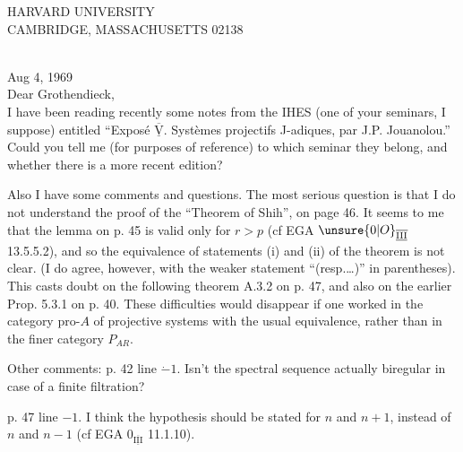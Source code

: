 \begin{center}
{\sffamily HARVARD UNIVERSITY\\
CAMBRIDGE, MASSACHUSETTS 02138}
\end{center}
\\
\hfill Aug 4, 1969\\

\noindent Dear Grothendieck,\\

I have been reading recently some notes from the IHES (one of your seminars, I suppose) entitled ``Exposé \(\overline{\underline{\mathrm{V}}}\). Systèmes
\reversemarginpar{}\normalmarginpar%
projectifs J-adiques, par J.P. Jouanolou.'' Could you tell me (for purposes of reference) to which seminar they belong, and whether there is a more recent edition?

Also I have some comments and questions. The most serious question is that I do not understand the proof of the ``Theorem of Shih'',  on page 46. It seems to me that the lemma on p. 45 is valid only for \(r>p\) (cf EGA \(\unsure{0|O}_{\overline{\underline{\mathrm{III}}}}\) 13.5.5.2), and so  the equivalence of statements (i) and (ii) of the theorem is not clear. (I do agree, however, with the weaker statement ``(resp.\ldots)'' in parentheses). This casts doubt on the following theorem A.3.2 on p. 47, and also on the earlier Prop. 5.3.1 on p. 40. These difficulties would disappear if one worked  in the category \(\mathrm{pro}\text{-}A\) \margin{\unsure{:}} of projective systems with the usual equivalence, rather than in the  finer category \(P_{AR}\).

Other comments: p. 42 line \(\dot{-}1\). Isn't the spectral sequence actually biregular in case of a finite filtration?

p. 47 line \(-1\). I think the hypothesis should be stated for \(n\) and \(n+1\), instead of \(n\) and \(n-1\) (cf EGA \(0_{\overline{\underline{\mathrm{III}}}}\) 11.1.10).
\clearpage
